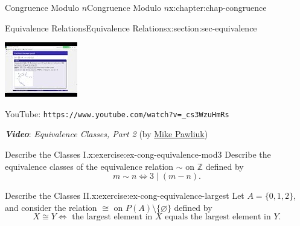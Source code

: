 \documentclass[oneside,10pt,]{book}
\newcommand{\mono}[1]{\texttt{#1}}
\newcommand{\alert}[1]{\textbf{\textit{#1}}}
\numberwithin{equation}{section}
\newlength{\qrsize}
\newlength{\previewwidth}
\begin{document}
\begin{chapterptx}{Congruence Modulo \(n\)}{}{Congruence Modulo \(n\)}{}{}{x:chapter:chap-congruence}
\begin{sectionptx}{Equivalence Relations}{}{Equivalence Relations}{}{}{x:section:sec-equivalence}
\begin{sidebyside}{1}{0}{0}{0}
\begin{sbspanel}{1}
\begin{tcbraster}[raster columns=2, raster column skip=1pt, raster halign=center, raster force size=false, raster left skip=0pt, raster right skip=0pt]
\begin{tcolorbox}[previewstyle, width=\previewwidth]
\includegraphics[width=0.80\linewidth,height=\qrsize,keepaspectratio]{images/video-equivalence-class-2.jpg}%
\end{tcolorbox}%
\begin{tcolorbox}[qrstyle]%
{\hypersetup{urlcolor=black}}%
\end{tcolorbox}%
\begin{tcolorbox}[captionstyle]%
\small YouTube: \mono{https://www.youtube.com/watch?v=\_cs3WzuHmRs}\end{tcolorbox}%
\end{tcbraster}%
\end{sbspanel}%
\end{sidebyside}%
\par
\alert{Video}: \emph{Equivalence Classes, Part 2} (by \href{https://www.youtube.com/channel/UCnzqLoGhxAA46i9xcPHZavQ}{Mike Pawliuk})%
\begin{inlineexercise}{Describe the Classes I.}{x:exercise:ex-cong-equivalence-mod3}%
Describe the equivalence classes of the equivalence relation \(\sim\) on \(\mathbb{Z}\) defined by%
\begin{equation*}
m \sim n \Leftrightarrow 3 \mid (m - n)\text{.}
\end{equation*}
%
\end{inlineexercise}%
\begin{inlineexercise}{Describe the Classes II.}{x:exercise:ex-cong-equivalence-largest}%
Let \(A = \{0,1,2\}\), and consider the relation \(\cong\) on \(P(A) \setminus \{\varnothing\}\) defined by%
\begin{equation*}
X \cong Y \Leftrightarrow \text{ the largest element in } X \text{ equals the largest element in } Y\text{.}
\end{equation*}

\end{inlineexercise}
\end{sectionptx}
\end{chapterptx}
\end{document}

